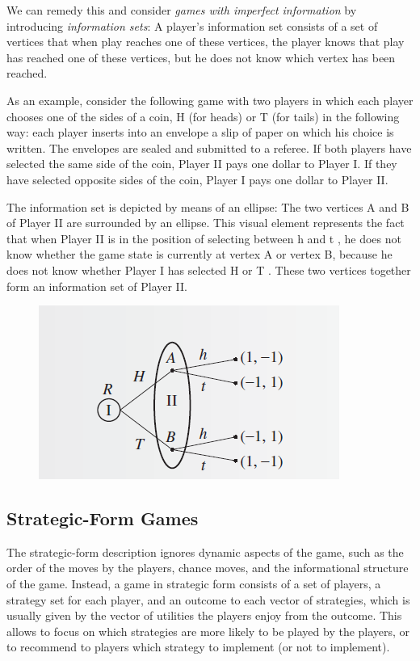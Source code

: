 We can remedy this and consider \emph{games with imperfect information} by introducing \emph{information sets}: A player’s information set consists of a set of vertices that when play reaches one of these vertices, the player knows that play has reached one of these vertices, but he does not know which vertex has been reached.

As an example, consider the following game with two players in which each player chooses one of the sides of a coin, H (for heads) or T (for tails) in the following way: each player inserts into an envelope a slip of paper on which his choice is written. The envelopes are sealed and submitted to a referee. If both players have selected the same side of the coin, Player II pays one dollar to Player I. If they have selected opposite sides of the coin, Player I pays one dollar to Player II.

The information set is depicted by means of an ellipse: The two vertices A and B of Player II are surrounded by an ellipse. This visual element represents the fact that when Player II is in the position of selecting between h and t , he does not know whether the game state is currently at vertex A or vertex B, because he does not know whether Player I has selected H or T . These two vertices together form an information set of Player II.

\begin{figure}[H]
    \centering
    \includegraphics[scale=1]{images/2023-10-10-game_theory_04.png}
\end{figure}

\subsection{Strategic-Form Games}

The strategic-form description ignores dynamic aspects of the game, such as the order of the moves by the players, chance moves, and the informational structure of the game. Instead, a game in strategic form consists of a set of players, a strategy set for each player, and an outcome to each vector of strategies, which is usually given by the vector of utilities the players enjoy from the outcome. This allows to focus on which strategies are more likely to be played by the players, or to recommend to players which strategy to implement (or not to implement).

